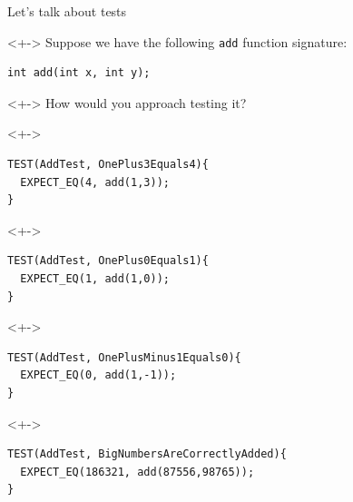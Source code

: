\documentclass{beamer}
\title{\mytitle}
\subtitle{How to write 1000s of tests in one sitting?}
\author{Patryk Ma\l{}ek}
\institute{\footnotesize\url{https://github.com/pmalek}}
\date{}
\begin{document}
  \maketitle


\begin{frame}[fragile]{Let's talk about tests}

\begin{uncoverenv}<+->
Suppose we have the following \texttt{add} function signature:
\begin{lstlisting}[style=cpp]
int add(int x, int y);
\end{lstlisting}
\end{uncoverenv}

\begin{uncoverenv}<+->
How would you approach testing it?
\end{uncoverenv}

\begin{uncoverenv}<+->
\begin{lstlisting}[style=cpp]
TEST(AddTest, OnePlus3Equals4){
  EXPECT_EQ(4, add(1,3));
}
\end{lstlisting}
\end{uncoverenv}

\begin{uncoverenv}<+->
\begin{lstlisting}[style=cpp]
TEST(AddTest, OnePlus0Equals1){
  EXPECT_EQ(1, add(1,0));
}
\end{lstlisting}
\end{uncoverenv}

\begin{uncoverenv}<+->
\begin{lstlisting}[style=cpp]
TEST(AddTest, OnePlusMinus1Equals0){
  EXPECT_EQ(0, add(1,-1));
}
\end{lstlisting}
\end{uncoverenv}

\begin{uncoverenv}<+->
\begin{lstlisting}[style=cpp]
TEST(AddTest, BigNumbersAreCorrectlyAdded){
  EXPECT_EQ(186321, add(87556,98765));
}
\end{lstlisting}
\end{uncoverenv}

\end{frame}

\end{document}
